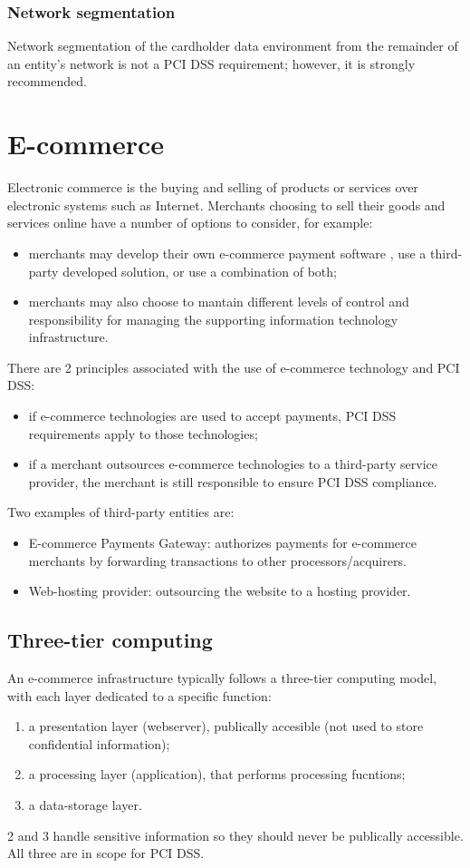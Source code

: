 \documentclass[a4paper, 10pt, titlepage]{article}
\begin{document}
\subsubsection{Network segmentation}
Network segmentation of the cardholder data environment from the remainder of an entity's network is not a PCI DSS requirement; however, it is strongly recommended.

\section{E-commerce}
Electronic commerce is the buying and selling of products or services over electronic systems such as Internet. Merchants choosing to sell their goods and services online have a number of options to consider, for example:
\begin{itemize}
\item merchants may develop their own e-commerce payment software , use a third-party developed solution, or use a combination of both;
\item merchants may also choose to mantain different levels of control and responsibility for managing the supporting information technology infrastructure.
\end{itemize}
There are 2 principles associated with the use of e-commerce technology and PCI DSS:
\begin{itemize}
\item if e-commerce technologies are used to accept payments, PCI DSS requirements apply to those technologies;
\item if a merchant outsources e-commerce technologies to a third-party service provider, the merchant is still responsible to ensure PCI DSS compliance.
\end{itemize}
Two examples of third-party entities are:
\begin{itemize}
\item E-commerce Payments Gateway: authorizes payments for e-commerce merchants by forwarding transactions to other processors/acquirers.
\item Web-hosting provider: outsourcing the website to a hosting provider.
\end{itemize}

\subsection{Three-tier computing}
An e-commerce infrastructure typically follows a three-tier computing model, with each layer dedicated to a specific function:
\begin{enumerate}
\item a presentation layer (webserver), publically accesible (not used to store confidential information);
\item a processing layer (application), that performs processing fucntions;
\item a data-storage layer.
\end{enumerate}
2 and 3 handle sensitive information so they should never be publically accessible. All three are in scope for PCI DSS.
\end{document}
